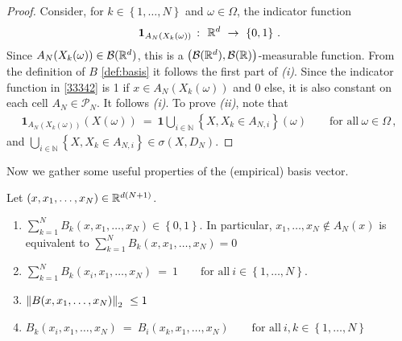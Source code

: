 \begin{proof}
Consider,
for $k\in \left\{
  1,\ldots,N
\right\}$
and $\omega\in\Omega$,
the indicator function
\begin{align}
  \label{33342}
  \mathbf{1}
  _
  {A_N(X_k(\omega))}
  \ 
  \colon
  \ 
  \R^d
  \ 
  \to
  \ 
  \left\{
    0,1
  \right\}
  \,.
\end{align}
Since 
$
  {A_N(X_k(\omega))}
  \in\mathcal{B}(\mathbb{R}^d)
$,
this is a 
  $\left(
    \mathcal{B}(\mathbb{R}^d),\mathcal{B}(\mathbb{R})
  \right)$-measurable
  function.
  From the definition of $B$ \eqref{def:basis} it follows the first part of \textit{(i)}.
  Since the indicator function in \eqref{33342} is 1 if $
  x\in
  {A_N(X_k(\omega))}
  $
  and 0 else, it is also constant on each cell
  $A_N\in\mathcal{P}_N$.
  It follows \textit{(i)}.
  To prove \textit{(ii)}, note that
\begin{align*}
  \mathbf{1}
  _
  {A_N(X_k(\omega))}(X(\omega))
  \ 
  =
  \ 
  \mathbf{1}
  \bigcup_{i\in\mathbb{N}}
  \left\{
    X,X_k \in A_{N,i}
  \right\}
  (\omega)
  \qquad
  \text{for all}\ 
  \omega\in\Omega
  \,,
\end{align*}
and
$
  \bigcup_{i\in\mathbb{N}}
  \left\{
    X,X_k \in A_{N,i}
  \right\}
  \in\sigma(X,D_N)
  $.
\end{proof}
%
Now we gather some useful properties of the (empirical) basis vector.
\begin{lemma}
  \label{lem:basis_sum}
  Let $(x,x_1,\ldots,x_N)\in\mathbb{R}^{d(N+1)}$.
  \begin{enumerate}[label=(\roman*)]
    \item
      $
      \sum_{k=1}^{N} 
      B_k(x,x_1,\ldots,x_N)
      \in
      \left\{ 0,1 \right\}
      $. 
      In particular,
      $
        x_1,\ldots,x_N\notin A_N(x)
      $
      is equivalent to
      $
      \sum_{k=1}^{N} 
      B_k(x,x_1,\ldots,x_N)
      =0
      $
    \item
      $
      \sum_{k=1}^{N} 
      B_k(x_i,x_1,\ldots,x_N)
      \ 
      =
      \ 
      1
      \qquad
      \text{for all}\ 
      i\in \left\{ 1,\ldots,N \right\}
      $.
      \item
        $
        \norm
        {
      B(x,x_1,\ldots,x_N)
        }_2
        \ 
        \le 1
        \ 
        $
      \item
        $
        B_k(x_i,x_1,\ldots,x_N)
        \ 
        =
        \ 
        B_i(x_k,x_1,\ldots,x_N)
        \qquad
        \text{for all}\ 
        i,k\in \left\{ 1,\ldots,N \right\}
        $
  \end{enumerate}
\end{lemma}
